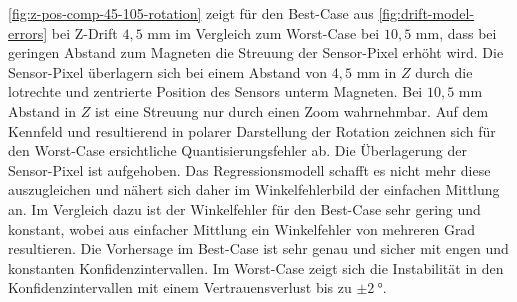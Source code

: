 \clearpage


\autoref{fig:z-pos-comp-45-105-rotation} zeigt für den Best-Case aus \autoref{fig:drift-model-errors} bei Z-Drift $4,5$ mm im Vergleich zum Worst-Case bei $10,5$ mm, dass bei geringen Abstand zum Magneten die Streuung der Sensor-Pixel erhöht wird. Die Sensor-Pixel überlagern sich bei einem Abstand von $4,5$ mm in $Z$ durch die lotrechte und zentrierte Position des Sensors unterm Magneten. Bei $10,5$ mm Abstand in $Z$ ist eine Streuung nur durch einen Zoom wahrnehmbar. Auf dem Kennfeld und resultierend in polarer Darstellung der Rotation zeichnen sich für den Worst-Case ersichtliche Quantisierungsfehler ab. Die Überlagerung der Sensor-Pixel ist aufgehoben. Das Regressionsmodell schafft es nicht mehr diese auszugleichen und nähert sich daher im Winkelfehlerbild der einfachen Mittlung an.
\newline
Im Vergleich dazu ist der Winkelfehler für den Best-Case sehr gering und konstant, wobei aus einfacher Mittlung ein Winkelfehler von mehreren Grad resultieren. Die Vorhersage im Best-Case ist sehr genau und sicher mit engen und konstanten Konfidenzintervallen. Im Worst-Case zeigt sich die Instabilität in den Konfidenzintervallen mit einem Vertrauensverlust bis zu $\pm\SI{2}{\degree}$.


